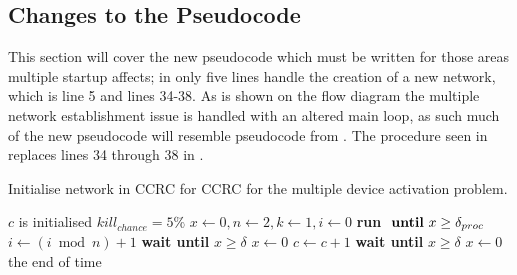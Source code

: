 \subsection{Changes to the Pseudocode}
This section will cover the new pseudocode which must be written for those areas multiple startup affects; in  only five lines handle the creation of a new network, which is line 5 and lines 34-38.
As is shown on the flow diagram  the multiple network establishment issue is handled with an altered main loop, as such much of the new pseudocode will resemble pseudocode from .
The procedure seen in  replaces lines 34 through 38 in . 
\begin{algorithm}
\caption{Initialise network in CCRC for CCRC for the multiple device activation problem.}
\label{lst:networkMultiStartCCRC2}
\begin{algorithmic}[1]
\Require $c$ is initialised 
\Require $kill_{chance} = 5\%$ 
    \State $x \gets 0, n \gets 2, k \gets 1, i \gets 0$
    \Repeat {}
        \State \textbf{run}  $\text{ \textbf{until} }x \ge \delta_{proc}$
        \State $i \gets (i \bmod n) + 1$ 
            \State {} 
            \State {}
        \Else
                    \State {}
                    \State {}
                        \State \textbf{wait until } $x \ge \delta$  
                        \State $x \gets 0$
                        \State {}
                    \EndIf
                \Else
                     
                        \State $c \gets c + 1$
                        \State {} 
                    \EndIf
                \EndIf
            \EndWhile
        \EndIf
        \State \textbf{wait until } $x \ge \delta$  
        \State $x \gets 0$
        \State {}
    \Until the end of time
\EndProcedure    
\end{algorithmic}
\end{algorithm}

